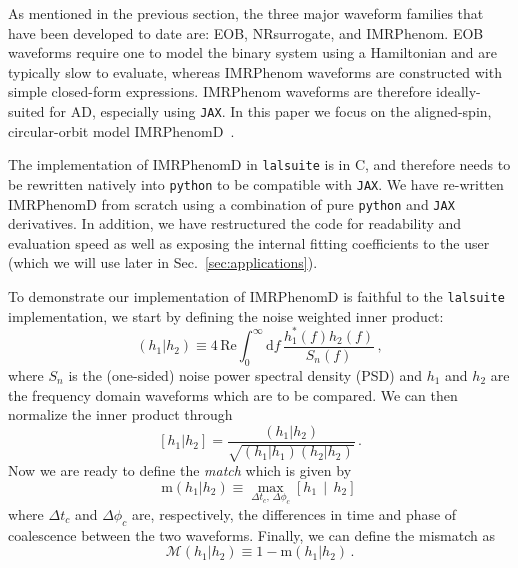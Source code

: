 \documentclass[twocolumn]{aastex631}
\newcommand{\jax}{\texttt{JAX}\xspace}
\newcommand{\lalsuite}{\texttt{lalsuite}\xspace}
\newcommand{\mi}[1]{\textbf{\color{teal}(MI: #1)}}
\begin{document}
As mentioned in the previous section, the three major waveform families that have been developed to date are:  EOB,  NRsurrogate, and IMRPhenom.
EOB waveforms require one to model the binary system using a Hamiltonian and are typically slow to evaluate, whereas IMRPhenom waveforms are constructed with simple closed-form expressions.
IMRPhenom waveforms are therefore ideally-suited for AD, especially using \jax. 
In this paper we focus on the aligned-spin, circular-orbit model IMRPhenomD~\citep{Husa:2015iqa, Khan:2015jqa}.

The implementation of IMRPhenomD in \lalsuite is in C, and therefore needs to be rewritten natively into \texttt{python} to be compatible with \jax.
We have re-written IMRPhenomD from scratch using a combination of pure \texttt{python} and \jax derivatives.
In addition, we have restructured the code for readability and evaluation speed as well as exposing the internal fitting coefficients to the user (which we will use later in Sec.~\ref{sec:applications}).

To demonstrate our implementation of IMRPhenomD is faithful to the \lalsuite implementation, we start by defining the noise weighted inner product:
\begin{equation}
    \label{eq:inner_prod}
    \left(h_1|h_2\right) \equiv 4 \, \mathrm{Re} \int^{\infty}_{0} \mathrm{d} f \, \frac{ h^*_1(f) h_2(f)}{S_n(f)}\, ,
\end{equation}
where $S_n$ is the (one-sided) noise power spectral density (PSD) and $h_1$ and $h_2$ are the frequency domain waveforms which are to be compared.
We can then normalize the inner product through
\begin{equation}
    \left[h_1|h_2\right] = \frac{\left(h_1|h_2\right)}{\sqrt{\left(h_1|h_1\right)\left(h_2|h_2\right)}}\, .
\end{equation}
Now we are ready to define the \textit{match} which is given by 
\begin{equation}
    \mathrm{m}(h_1|h_2) \equiv \max_{\Delta t_c,\, \Delta \phi_c} \left[h_1 \, \middle| \, h_2 \right]\,
\end{equation}
where $\Delta t_c$ and $\Delta \phi_c$ are, respectively, the differences in time and phase of coalescence between the two waveforms.
Finally, we can define the mismatch as 
\begin{equation}
    \label{eq:mismatch_1}
	\mathcal{M}(h_1|h_2) \equiv 1- \mathrm{m}(h_1|h_2)\,.
\end{equation}
\end{document}
